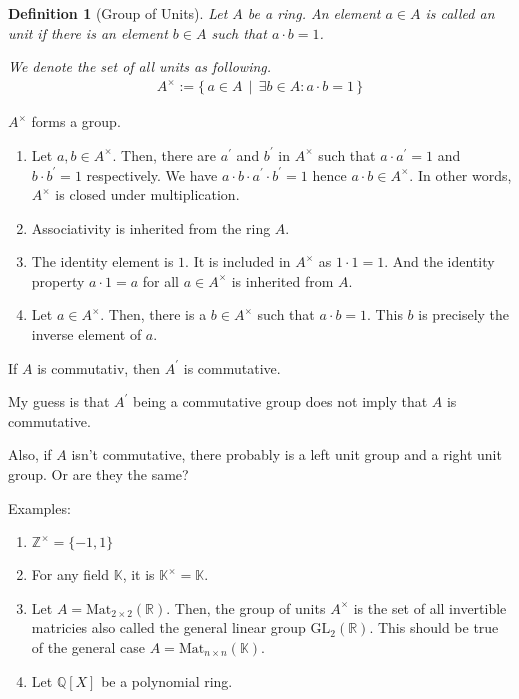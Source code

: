 \documentclass{book}
\theoremstyle{custom_definition}
\newtheorem{definition}{Definition}
\begin{document}
    \begin{definition}[Group of Units]
        Let \(A\) be a ring. An element \(a \in A\) is called an unit if there is an element \(b \in A\) such that \(a \cdot b = 1\).

        We denote the set of all units as following.
        \begin{align}
            A^\times := \{\, a \in A \, \mid\, \exists b \in A : a \cdot b = 1 \,\}
        \end{align}
    \end{definition}

    \(A^\times\) forms a group.

    \begin{enumerate}
        \item Let \(a, b \in A^\times\). Then, there are \(a^\prime\) and \(b^\prime\) in \(A^\times\) such that \(a \cdot a^\prime = 1\) and \(b \cdot b^\prime = 1\) respectively. We have \(a \cdot b \cdot a^\prime \cdot b^\prime = 1\) hence \(a \cdot b \in A^\times\). In other words, \(A^\times\) is closed under multiplication.
        \item Associativity is inherited from the ring \(A\).
        \item The identity element is \(1\). It is included in \(A^\times\) as \(1 \cdot 1 = 1\). And the identity property \(a \cdot 1 = a\) for all \(a \in A^\times\) is inherited from \(A\).
        \item Let \(a \in A^\times\). Then, there is a \(b \in A^\times\) such that \(a \cdot b = 1\). This \(b\) is precisely the inverse element of \(a\).
    \end{enumerate}

    If \(A\) is commutativ, then \(A^\prime\) is commutative.

    My guess is that \(A^\prime\) being a commutative group does not imply that \(A\) is commutative.

    Also, if \(A\) isn't commutative, there probably is a left unit group and a right unit group. Or are they the same?

    Examples:

    \begin{enumerate}
        \item \(\mathbb{Z}^\times = \{ -1, 1 \}\)
        \item For any field \(\mathbb{K}\), it is \(\mathbb{K}^\times = \mathbb{K}\).
        \item Let \(A = \text{Mat}_{2 \times 2}(\mathbb{R})\). Then, the group of units \(A^\times\) is the set of all invertible matricies also called the general linear group \(\text{GL}_2(\mathbb{R})\). This should be true of the general case \(A = \text{Mat}_{n \times n}{(\mathbb{K})}\).
        \item Let \(\mathbb{Q}[X]\) be a polynomial ring.
    \end{enumerate}
\end{document}

